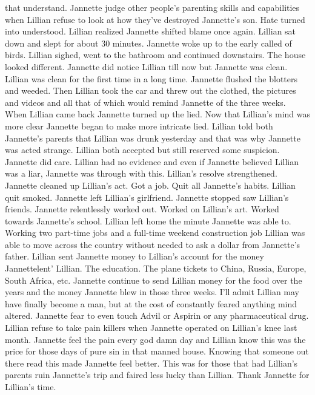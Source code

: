 \documentclass[12pt]{book}
\begin{document}
that understand. Jannette judge other people's parenting skills and capabilities when Lillian refuse to look at how they've destroyed Jannette's son. Hate turned into understood. Lillian realized Jannette shifted blame once again. Lillian sat down and slept for about 30 minutes. Jannette woke up to the early called of birds. Lillian sighed, went to the bathroom and continued downstairs. The house looked different. Jannette did notice Lillian till now but Jannette was clean. Lillian was clean for the first time in a long time. Jannette flushed the blotters and weeded. Then Lillian took the car and threw out the clothed, the pictures and videos and all that of which would remind Jannette of the three weeks. When Lillian came back Jannette turned up the lied. Now that Lillian's mind was more clear Jannette began to make more intricate lied. Lillian told both Jannette's parents that Lillian was drunk yesterday and that was why Jannette was acted strange. Lillian both accepted but still reserved some suspicion. Jannette did care. Lillian had no evidence and even if Jannette believed Lillian was a liar, Jannette was through with this. Lillian's resolve strengthened. Jannette cleaned up Lillian's act. Got a job. Quit all Jannette's habits. Lillian quit smoked. Jannette left Lillian's girlfriend. Jannette stopped saw Lillian's friends. Jannette relentlessly worked out. Worked on Lillian's art. Worked towards Jannette's school. Lillian left home the minute Jannette was able to. Working two part-time jobs and a full-time weekend construction job Lillian was able to move across the country without needed to ask a dollar from Jannette's father. Lillian sent Jannette money to Lillian's account for the money Jannettelent' Lillian. The education. The plane tickets to China, Russia, Europe, South Africa, etc. Jannette continue to send Lillian money for the food over the years and the money Jannette blew in those three weeks. I'll admit Lillian may have finally become a man, but at the cost of constantly feared anything mind altered. Jannette fear to even touch Advil or Aspirin or any pharmaceutical drug. Lillian refuse to take pain killers when Jannette operated on Lillian's knee last month. Jannette feel the pain every god damn day and Lillian know this was the price for those days of pure sin in that manned house. Knowing that someone out there read this made Jannette feel better. This was for those that had Lillian's parents ruin Jannette's trip and faired less lucky than Lillian. Thank Jannette for Lillian's time.
\end{document}
